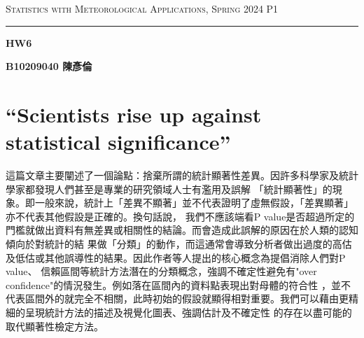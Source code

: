 \documentclass{article}
\author{B10209040 陳彥倫}
\begin{document}
\thispagestyle{empty}
\hfill {\scshape \large Statistics with Meteorological Applications, Spring 2024} \hfill {\scshape P1}
\smallskip
\hrule
\begin{CJK*}{UTF8}{bsmi}
\bigskip
\bigskip
\bigskip

\centerline{\huge \textbf {HW6}}
\bigskip
\centerline{\textbf {B10209040 陳彥倫}}

\bigskip
\bigskip
\bigskip

\section*{“Scientists rise up against statistical significance”}
    \begin{spacing}{2.5}
        \begin{large}
        這篇文章主要闡述了一個論點：捨棄所謂的統計顯著性差異。因許多科學家及統計學家都發現人們甚至是專業的研究領域人士有濫用及誤解
        「統計顯著性」的現象。即一般來說，統計上「差異不顯著」並不代表證明了虛無假設，「差異顯著」亦不代表其他假設是正確的。換句話說，
        我們不應該端看P value是否超過所定的門檻就做出資料有無差異或相關性的結論。而會造成此誤解的原因在於人類的認知傾向於對統計的結
        果做「分類」的動作，而這通常會導致分析者做出過度的高估及低估或其他誤導性的結果。因此作者等人提出的核心概念為提倡消除人們對P value、
        信賴區間等統計方法潛在的分類概念，強調不確定性避免有"over confidence"的情況發生。例如落在區間內的資料點表現出對母體的符合性
        ，並不代表區間外的就完全不相關，此時初始的假設就顯得相對重要。我們可以藉由更精細的呈現統計方法的描述及視覺化圖表、強調估計及不確定性
        的存在以盡可能的取代顯著性檢定方法。
        \end{large}
    \end{spacing}



\end{CJK*}
\end{document}
